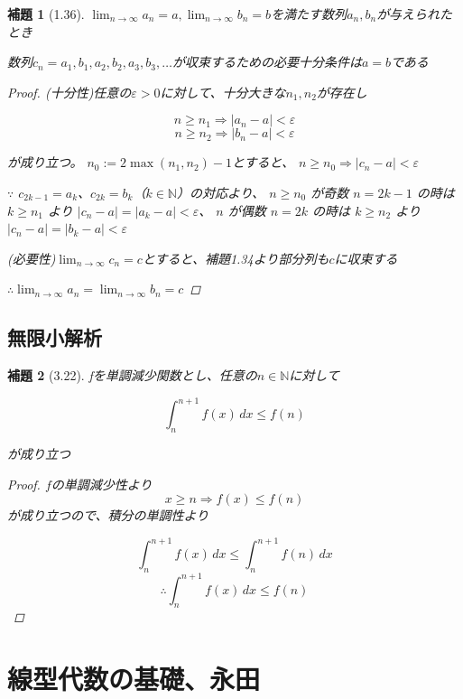 \documentclass{book}
\newtheorem*{lemma}{補題}
\begin{document}
\begin{lemma}[1.36]
  $\lim_{n \to \infty}a_n = a, \lim_{n \to \infty}b_n = b$を満たす数列$a_n,
  b_n$が与えられたとき

  数列$c_n = a_1,b_1,a_2,b_2,a_3,b_3,\dots$が収束するための必要十分条件は$a = b$である

  \begin{proof}
    (十分性)任意の$\varepsilon > 0$に対して、十分大きな$n_1, n_2$が存在し

    \[n \geq n_1 \Rightarrow |a_n - a| < \varepsilon\]
    \[n \geq n_2 \Rightarrow |b_n - a| < \varepsilon\]

    が成り立つ。
    $n_0 := 2\max(n_1, n_2) - 1$とすると、
    $n \geq n_0 \Rightarrow |c_n -a| < \varepsilon$

    $\because$ $c_{2k-1} = a_k$、$c_{2k} = b_k$（$k \in \mathbb{N}$）の対応より、
    $n \geq n_0$ が奇数 $n = 2k-1$ の時は $k \geq n_1$ より
    $|c_n - a| = |a_k - a| < \varepsilon$、
    $n$ が偶数 $n = 2k$ の時は $k \geq n_2$ より $|c_n - a| = |b_k - a| < \varepsilon$

    (必要性)$\lim_{n \to \infty}c_n = c$とすると、補題1.34より部分列も$c$に収束する

    $\therefore \lim_{n \to \infty}a_n = \lim_{n \to \infty}b_n = c$
  \end{proof}
\end{lemma}

\section{無限小解析}

\begin{lemma}[3.22]
  fを単調減少関数とし、任意の$n \in \mathbb{N}$に対して

  \[
    \int_{n}^{n+1}f(x)\,dx \leq f(n)
  \]

  が成り立つ

  \begin{proof}
    $f$の単調減少性より
    \[
      x \geq n \Rightarrow f(x) \leq f(n)
    \]
    が成り立つので、積分の単調性より

    \[
      \int_{n}^{n+1} f(x) \,dx \leq \int_{n}^{n+1} f(n) \,dx
    \]
    \[
      \therefore \int_{n}^{n+1}f(x)\,dx \leq f(n)
    \]
  \end{proof}
\end{lemma}

\chapter{線型代数の基礎、永田}
\end{document}
